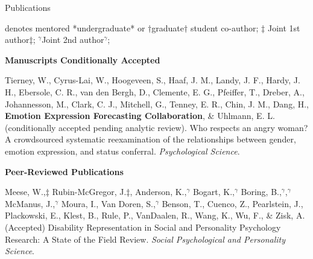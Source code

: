 \begin{rSection}{\textrm{Publications}}%
\vspace{-1mm}\begin{center}\footnotesize{denotes mentored *undergraduate* or $\dagger$graduate$\dagger$ student co-author; $\ddagger$ Joint 1st author$\ddagger$; $^\gamma$Joint 2nd author$^\gamma$; }\end{center}\vspace{-1mm}

{\large \textbf{Manuscripts Conditionally Accepted}}
\begin{etaremune}

\item Tierney, W., Cyrus-Lai, W., Hoogeveen, S., Haaf, J. M., Landy, J. F., Hardy, J. H., Ebersole, C. R., van den Bergh, D., Clemente, E. G., Pfeiffer, T., Dreber, A., Johannesson, M., Clark, C. J., Mitchell, G., Tenney, E. R., Chin, J. M., Dang, H., \textbf{Emotion Expression Forecasting Collaboration}, \& Uhlmann, E. L. (conditionally accepted pending analytic review). Who respects an angry woman? A crowdsourced systematic reexamination of the relationships between gender, emotion expression, and status conferral. \textit{Psychological Science}.
\end{etaremune}

{\large \textbf{Peer-Reviewed Publications}}
\begin{etaremune}
\item Meese, W.,{\footnotesize{$\ddagger$}} Rubin-McGregor, J.{\footnotesize{$\ddagger$}}, Anderson, K.,{\footnotesize{$^\gamma$}} Bogart, K.,{\footnotesize{$^\gamma$}} Boring, B.,{\footnotesize{$^\gamma$}}\meb,{\footnotesize{$^\gamma$}} McManus, J.,{\footnotesize{$^\gamma$}} Moura, I., Van Doren, S.,{\footnotesize{$^\gamma$}} Benson, T., Cuenco, Z., Pearlstein, J., Plackowski, E., Klest, B., Rule, P., VanDaalen, R., Wang, K., Wu, F., \& Zisk, A. (Accepted) Disability Representation in Social and Personality Psychology Research: A State of the Field Review. \textit{Social Psychological and Personality Science}. \href{https://osf.io/preprints/psyarxiv/wqamk}{\small\color{blue}{osf.io/preprints/psyarxiv/wqamk}}


\end{etaremune}
\end{rSection}
